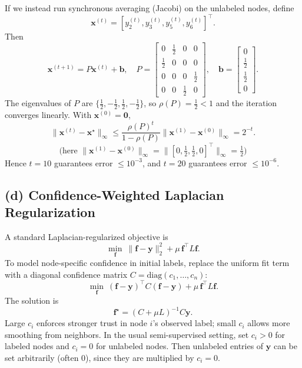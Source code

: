 \documentclass[11pt]{article}
\begin{document}
If we instead run synchronous averaging (Jacobi) on the unlabeled nodes, define
\[
\mathbf{x}^{(t)}=[y_2^{(t)},y_3^{(t)},y_5^{(t)},y_6^{(t)}]^\top.
\]
Then
\[
\mathbf{x}^{(t+1)}=P\mathbf{x}^{(t)}+\mathbf{b},
\quad
P=
\begin{bmatrix}
0&\tfrac12&0&0\\
\tfrac12&0&0&0\\
0&0&0&\tfrac12\\
0&0&\tfrac12&0
\end{bmatrix},
\quad
\mathbf{b}=
\begin{bmatrix}
0\\ \tfrac12\\ \tfrac12\\ 0
\end{bmatrix}.
\]
The eigenvalues of \(P\) are \(\{\tfrac12,-\tfrac12,\tfrac12,-\tfrac12\}\), so \(\rho(P)=\tfrac12<1\) and the iteration converges linearly. With \(\mathbf{x}^{(0)}=\mathbf{0}\),
\[
\|\mathbf{x}^{(t)}-\mathbf{x}^\star\|_\infty
\le
\frac{\rho(P)^t}{1-\rho(P)}\|\mathbf{x}^{(1)}-\mathbf{x}^{(0)}\|_\infty
=2^{-t}.
\]
\[
\text{(here }\|\mathbf{x}^{(1)}-\mathbf{x}^{(0)}\|_\infty=\|[0,\tfrac12,\tfrac12,0]^\top\|_\infty=\tfrac12\text{)}
\]
Hence \(t=10\) guarantees error \(\le 10^{-3}\), and \(t=20\) guarantees error \(\le 10^{-6}\).

\subsection*{(d) Confidence-Weighted Laplacian Regularization}

A standard Laplacian-regularized objective is
\[
\min_{\mathbf{f}}\ \|\mathbf{f}-\mathbf{y}\|_2^2+\mu\,\mathbf{f}^{\top}L\mathbf{f}.
\]
To model node-specific confidence in initial labels, replace the uniform fit term with a diagonal confidence matrix $C=\mathrm{diag}(c_1,\ldots,c_n)$:
\[
\min_{\mathbf{f}}\ (\mathbf{f}-\mathbf{y})^{\top}C(\mathbf{f}-\mathbf{y})+\mu\,\mathbf{f}^{\top}L\mathbf{f}.
\]
The solution is
\[
\mathbf{f}^{\star}=(C+\mu L)^{-1}C\mathbf{y}.
\]
Large $c_i$ enforces stronger trust in node $i$'s observed label; small $c_i$ allows more smoothing from neighbors.
In the usual semi-supervised setting, set \(c_i>0\) for labeled nodes and \(c_i=0\) for unlabeled nodes. Then unlabeled entries of \(\mathbf{y}\) can be set arbitrarily (often 0), since they are multiplied by \(c_i=0\).
\end{document}
